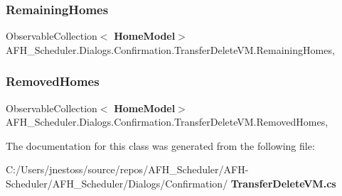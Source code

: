 \subsubsection{RemainingHomes}
{\footnotesize\ttfamily Observable\+Collection$<$\textbf{ Home\+Model}$>$ A\+F\+H\+\_\+\+Scheduler.\+Dialogs.\+Confirmation.\+Transfer\+Delete\+V\+M.\+Remaining\+Homes\hspace{0.3cm}{\ttfamily [get]}, {\ttfamily [set]}}

\mbox{\label{class_a_f_h___scheduler_1_1_dialogs_1_1_confirmation_1_1_transfer_delete_v_m_a90ea7f6581d237f1c337d8f2dadfce72}} 
\subsubsection{RemovedHomes}
{\footnotesize\ttfamily Observable\+Collection$<$\textbf{ Home\+Model}$>$ A\+F\+H\+\_\+\+Scheduler.\+Dialogs.\+Confirmation.\+Transfer\+Delete\+V\+M.\+Removed\+Homes\hspace{0.3cm}{\ttfamily [get]}, {\ttfamily [set]}}



The documentation for this class was generated from the following file\+:\begin{DoxyCompactItemize}
\item 
C\+:/\+Users/jnestoss/source/repos/\+A\+F\+H\+\_\+\+Scheduler/\+A\+F\+H-\/\+Scheduler/\+A\+F\+H\+\_\+\+Scheduler/\+Dialogs/\+Confirmation/\textbf{ Transfer\+Delete\+V\+M.\+cs}\end{DoxyCompactItemize}
